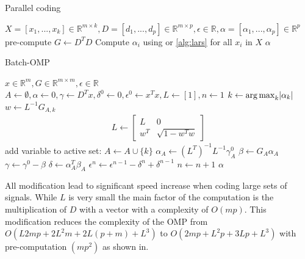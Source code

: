 \begin{algorithm}[H]
\caption{Parallel coding}
\label{alg:parallel}
\begin{algorithmic}[1]
\REQUIRE $X =[x_1,...,x_k]  \in \mathbb{R}^{m \times k}, D  =[d_1,...,d_p]  \in
\mathbb{R}^{m\times p}, \epsilon \in \mathbb{R}, \alpha =
[\alpha_1,...,\alpha_p] \in
\mathbb{R}^{p}$
\STATE pre-compute $G \gets D^TD$
\STATE Compute $\alpha_i$ using  or
\ref{alg:lars} for all ${x_i}$ in $X$
\ENDFOR
\RETURN $\alpha$
\end{algorithmic}
\end{algorithm}

\begin{algorithm}[H]
\caption{Batch-OMP}
\label{alg:batchOMP}
\begin{algorithmic}[1]
\REQUIRE $x \in \mathbb{R}^{m}, G  \in
\mathbb{R}^{m\times m}, \epsilon \in \mathbb{R}$
\STATE $A \gets \emptyset,\alpha \gets 0,\gamma \gets D^Tx,\delta^0 \gets
0, \epsilon^0\gets x^Tx,L\gets[1],n\gets1$
\STATE $k \gets \operatorname*{arg\,max}_k\lvert \alpha_k \rvert$
\STATE $w \gets L^{-1}G_{A,k}$
\STATE
\begin{align}
L \gets \left[
\begin{array}{ccc}
L & 0\\
w^T & \sqrt{1-w^Tw}
\end{array}
\right]
\end{align}
\ENDIF
\STATE add variable to active set: $A \gets A \cup \{ k\}$
\STATE $\alpha_A \gets (L^T)^{-1}L^{-1}\gamma_A^0$
\STATE $\beta \gets G_A\alpha_A$
\STATE $\gamma \gets \gamma^0-\beta$
\STATE $\delta \gets \alpha_A^T\beta_A$
\STATE $\epsilon^n \gets \epsilon^{n-1} - \delta^n + \delta^{n-1}$
\STATE $n \gets n+1$
\ENDWHILE
\RETURN $\alpha$
\end{algorithmic}
\end{algorithm}


All modification lead to significant speed increase when coding large sets of
signals. While $L$ is very small the main factor of the computation is
the multiplication of $D$ with a vector with a complexity of $O(mp)$. 
This modification reduces the complexity of the OMP from $O\left(L2mp + 2L^2m +
2L(p+m) + L^3\right)$ to $O\left(2mp + L^2p + 3Lp + L^3\right)$ 
with pre-computation $\left(mp^2\right)$ as shown in\cite{Rubinstein2008}. 


